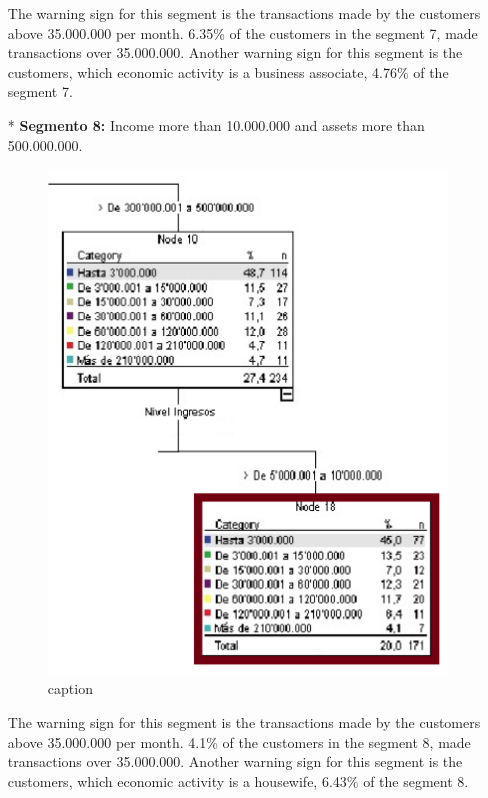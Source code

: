 \begin{itemize}
\begin{figure}[ht!]
\end{figure}
The warning sign for this segment is the transactions made by the customers above 35.000.000 per month.  6.35\% of the customers in the segment 7, made transactions over 35.000.000.
Another warning sign for this segment is the customers, which economic activity is a business associate, 4.76\% of the segment 7.
\item[*] \textbf{Segmento 8:}
Income more than 10.000.000 and assets more than 500.000.000.
\begin{figure}[ht!]
  \centering
  \includegraphics[scale=0.65]{Segmento8}
  \caption{caption}

\end{figure}
The warning sign for this segment is the transactions made by the customers above 35.000.000 per month.  4.1\% of the	 customers in the segment 8, made transactions over 35.000.000.
Another warning sign for this segment is the customers, which economic activity is a housewife, 6.43\% of the segment 8.
\end{itemize}
